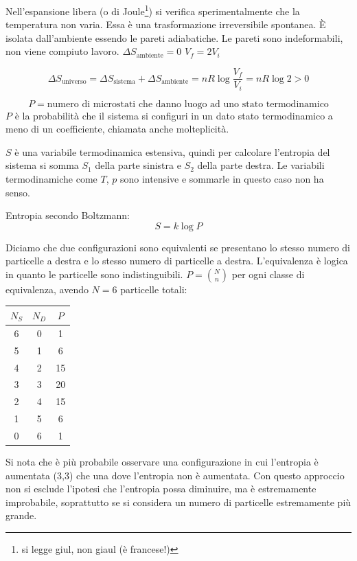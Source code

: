 Nell'espansione libera (o di Joule\footnote{si legge giul, non giaul (è francese!)}) si verifica sperimentalmente che la temperatura non varia. Essa è una trasformazione irreversibile spontanea. \`E isolata dall'ambiente essendo le pareti adiabatiche. Le pareti sono indeformabili, non viene compiuto lavoro. $\Delta S_\text{ambiente}=0$ $V_f=2V_i$

\[\Delta S_\text{universo}=\Delta S_\text{sistema}+\Delta S_\text{ambiente}=nR\log\frac{V_f}{V_i}=nR\log 2>0\]

\[P=\text{numero di microstati che danno luogo ad uno stato termodinamico}\]
$P$ è la probabilità che il sistema si configuri in un dato stato termodinamico a meno di un coefficiente, chiamata anche molteplicità.

$S$ è una variabile termodinamica estensiva, quindi per calcolare l'entropia del sistema si somma $S_1$ della parte sinistra e $S_2$ della parte destra. Le variabili termodinamiche come $T$, $p$ sono intensive e sommarle in questo caso non ha senso.
\begin{legge}
Entropia secondo Boltzmann:
\begin{equation}
S=k\log P
\end{equation}
\end{legge}
Diciamo che due configurazioni sono equivalenti se presentano lo stesso numero di particelle a destra e lo stesso numero di particelle a destra. L'equivalenza è logica in quanto le particelle sono indistinguibili. $P=\binom{N}{n}$ per ogni classe di equivalenza, avendo $N=6$ particelle totali:
\begin{center}
\begin{tabular}{c|c|c}
$N_S$&$N_D$&$P$\\
\hline
6&0&1\\
5&1&6\\
4&2&15\\
3&3&20\\
2&4&15\\
1&5&6\\
0&6&1\\
\end{tabular}
\end{center}
Si nota che è più probabile osservare una configurazione in cui l'entropia è aumentata (3,3) che una dove l'entropia non è aumentata. Con questo approccio non si esclude l'ipotesi che l'entropia possa diminuire, ma è estremamente improbabile, soprattutto se si considera un numero di particelle estremamente più grande.

